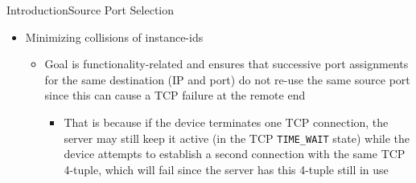 \documentclass[a4paper]{article}
\begin{document}
\begin{frame}[fragile]{Introduction}{Source Port Selection}
\begin{itemize}
\begin{itemize}
\begin{itemize}
			\end{itemize}
			\item Minimizing collisions of instance-ids
			\begin{itemize}
				\item Goal is functionality-related and ensures that successive port assignments for the same destination (IP and port) do not re-use the same source port since this can cause a TCP failure at the remote end
				\begin{itemize}
					\item That is because if the device terminates one TCP connection, the server may still keep it active (in the TCP \verb|TIME_WAIT| state) while the device attempts to establish a second connection with the same TCP 4-tuple, which will fail since the server has this 4-tuple still in use
				\end{itemize}
			\end{itemize}
		\end{itemize}
	\end{itemize}
\end{frame}
\end{document}
